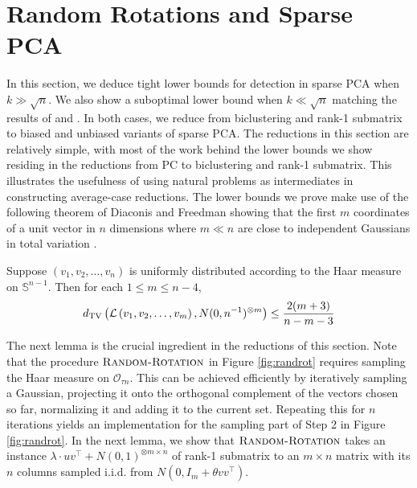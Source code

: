 \section{Random Rotations and Sparse PCA}
\label{s:rotations}

In this section, we deduce tight lower bounds for detection in sparse PCA when $k \gg \sqrt{n}$. We also show a suboptimal lower bound when $k \ll \sqrt{n}$ matching the results of \cite{berthet2013complexity} and \cite{gao2017sparse}. In both cases, we reduce from biclustering and rank-1 submatrix to biased and unbiased variants of sparse PCA. The reductions in this section are relatively simple, with most of the work behind the lower bounds we show residing in the reductions from PC to biclustering and rank-1 submatrix. This illustrates the usefulness of using natural problems as intermediates in constructing average-case reductions. The lower bounds we prove make use of the following theorem of Diaconis and Freedman showing that the first $m$ coordinates of a unit vector in $n$ dimensions where $m \ll n$ are close to independent Gaussians in total variation \cite{diaconis1987dozen}.

\begin{theorem}
Suppose $(v_1, v_2, \dots, v_n)$ is uniformly distributed according to the Haar measure on $\mathbb{S}^{n-1}$. Then for each $1 \le m \le n - 4$,
$$d_{\text{TV}}\left( \mathcal{L}\left( v_1, v_2, \dots, v_m \right), N(0, n^{-1})^{\otimes m} \right) \le \frac{2(m+3)}{n - m - 3}$$
\end{theorem}

The next lemma is the crucial ingredient in the reductions of this section. Note that the procedure $\textsc{Random-Rotation}$ in Figure \ref{fig:randrot} requires sampling the Haar measure on $\mathcal{O}_{\tau n}$. This can be achieved efficiently by iteratively sampling a Gaussian, projecting it onto the orthogonal complement of the vectors chosen so far, normalizing it and adding it to the current set. Repeating this for $n$ iterations yields an implementation for the sampling part of Step 2 in Figure \ref{fig:randrot}. In the next lemma, we show that $\textsc{Random-Rotation}$ takes an instance $\lambda \cdot uv^\top + N(0, 1)^{\otimes m \times n}$ of rank-1 submatrix to an $m \times n$ matrix with its $n$ columns sampled i.i.d. from $N(0, I_m + \theta vv^\top)$.

